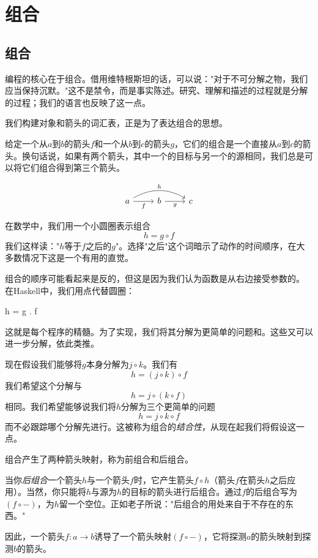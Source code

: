 \documentclass[DaoFP]{subfiles}
\begin{document}
\setcounter{chapter}{1}
\chapter{组合}

\section{组合}

编程的核心在于组合。借用维特根斯坦的话，可以说："对于不可分解之物，我们应当保持沉默。"这不是禁令，而是事实陈述。研究、理解和描述的过程就是分解的过程；我们的语言也反映了这一点。

我们构建对象和箭头的词汇表，正是为了表达组合的思想。

给定一个从$a$到$b$的箭头$f$和一个从$b$到$c$的箭头$g$，它们的组合是一个直接从$a$到$c$的箭头。换句话说，如果有两个箭头，其中一个的目标与另一个的源相同，我们总是可以将它们组合得到第三个箭头。

\[
 \begin{tikzcd}
 a
 \arrow[rr, bend left, "h"]
 \arrow[r, "f"']
 & b
 \arrow[r, "g"']
& c
 \end{tikzcd}
\]

在数学中，我们用一个小圆圈表示组合
\[h = g \circ f\]
我们这样读："$h$等于$f$之后的$g$"。选择"之后"这个词暗示了动作的时间顺序，在大多数情况下这是一个有用的直觉。

组合的顺序可能看起来是反的，但这是因为我们认为函数是从右边接受参数的。
在Haskell中，我们用点代替圆圈：
\begin{haskell}
h = g . f
\end{haskell}
这就是每个程序的精髓。为了实现，我们将其分解为更简单的问题和。这些又可以进一步分解，依此类推。

现在假设我们能够将$g$本身分解为$j \circ k$。我们有
\[h = (j \circ k) \circ f\]
我们希望这个分解与
\[h = j \circ (k \circ f)\]
相同。我们希望能够说我们将$h$分解为三个更简单的问题
\[h =  j \circ k \circ f\]
而不必跟踪哪个分解先进行。这被称为组合的\emph{结合性}，从现在起我们将假设这一点。

组合产生了两种箭头映射，称为前组合和后组合。

当你\emph{后组合}一个箭头$h$与一个箭头$f$时，它产生箭头$f \circ h$（箭头$f$在箭头$h$之后应用）。当然，你只能将$h$与源为$h$的目标的箭头进行后组合。通过$f$的后组合写为$(f \circ -)$，为$h$留一个空位。正如老子所说："后组合的用处来自于不存在的东西。"

因此，一个箭头$f \colon a \to b$诱导了一个箭头映射$(f \circ -)$，它将探测$a$的箭头映射到探测$b$的箭头。
\end{document}
